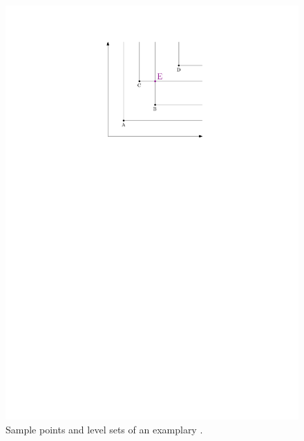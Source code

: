 \documentclass{book}
\begin{document}
\begin{figure}
	\centering \includegraphics[width=\textwidth]{./img/KS1.pdf}
	\caption{Sample points and level sets of an examplary \ecdf.}\label{simpleEcdf}
\end{figure}
\end{document}
